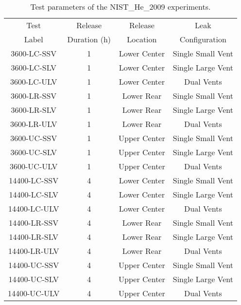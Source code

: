 \begin{table}[h]
\centering
\caption[Test parameters of the NIST\_He\_2009 experiments]{Test parameters of the NIST\_He\_2009 experiments.}
\begin{tabular}{|c|c|c|c|}
\hline
Test         &  Release          &  Release          &  Leak                         \\
Label        &  Duration (h)     &  Location         &  Configuration                \\ \hline \hline
3600-LC-SSV  &  1                &  Lower Center     &  Single Small Vent            \\ \hline
3600-LC-SLV  &  1                &  Lower Center     &  Single Large Vent            \\ \hline
3600-LC-ULV  &  1                &  Lower Center     &  Dual Vents                   \\ \hline
3600-LR-SSV  &  1                &  Lower Rear       &  Single Small Vent            \\ \hline
3600-LR-SLV  &  1                &  Lower Rear       &  Single Large Vent            \\ \hline
3600-LR-ULV  &  1                &  Lower Rear       &  Dual Vents                   \\ \hline
3600-UC-SSV  &  1                &  Upper Center     &  Single Small Vent            \\ \hline
3600-UC-SLV  &  1                &  Upper Center     &  Single Large Vent            \\ \hline
3600-UC-ULV  &  1                &  Upper Center     &  Dual Vents                   \\ \hline
14400-LC-SSV &  4                &  Lower Center     &  Single Small Vent            \\ \hline
14400-LC-SLV &  4                &  Lower Center     &  Single Large Vent            \\ \hline
14400-LC-ULV &  4                &  Lower Center     &  Dual Vents                   \\ \hline
14400-LR-SSV &  4                &  Lower Rear       &  Single Small Vent            \\ \hline
14400-LR-SLV &  4                &  Lower Rear       &  Single Large Vent            \\ \hline
14400-LR-ULV &  4                &  Lower Rear       &  Dual Vents                   \\ \hline
14400-UC-SSV &  4                &  Upper Center     &  Single Small Vent            \\ \hline
14400-UC-SLV &  4                &  Upper Center     &  Single Large Vent            \\ \hline
14400-UC-ULV &  4                &  Upper Center     &  Dual Vents                   \\ \hline
\end{tabular}
\label{NIST_He_2009_Parameters}
\end{table}

